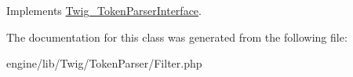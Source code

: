 Implements \hyperlink{interface_twig___token_parser_interface_a5dfa2e269321584fb74e8b43dabe0efd}{Twig\+\_\+\+Token\+Parser\+Interface}.



The documentation for this class was generated from the following file\+:\begin{DoxyCompactItemize}
\item 
engine/lib/\+Twig/\+Token\+Parser/Filter.\+php\end{DoxyCompactItemize}
